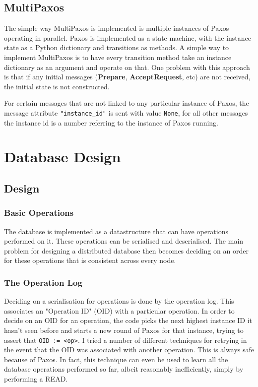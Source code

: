 \documentclass[12pt,twoside,notitlepage]{report}
\newcommand{\msg}[1] {{\bf #1}}
\begin{document}
\subsection{MultiPaxos}

The simple way MultiPaxos is implemented is multiple instances of Paxos operating in parallel.
Paxos is implemented as a state machine, with the instance state as a Python dictionary and
transitions as methods. A simple way to implement MultiPaxos is to have every transition method
take an instance dictionary as an argument and operate on that. One problem with this approach is
that if any initial messages (\msg{Prepare}, \msg{AcceptRequest}, etc) are not received, the
initial state is not constructed.

For certain messages that are not linked to any particular instance of Paxos, the message
attribute \verb+"instance_id"+ is sent with value \verb+None+, for all other messages the instance
id is a number referring to the instance of Paxos running.

\section{Database Design}

\subsection{Design}

\subsubsection{Basic Operations}

The database is implemented as a datastructure that can have operations performed on it. These
operations can be serialised and deserialised. The main problem for designing a distributed
database then becomes deciding on an order for these operations that is consistent across every
node.

\subsubsection{The Operation Log}

Deciding on a serialisation for operations is done by the operation log. This associates an
"Operation ID" (OID) with a particular operation. In order to decide on an OID for an operation,
the code picks the next highest instance ID it hasn't seen before and starts a new round of Paxos
for that instance, trying to assert that \verb$OID := <op>$. I tried a number of different
techniques for retrying in the event that the OID was associated with another operation. This is
always safe because of Paxos. In fact, this technique can even be used to learn all the database
operations performed so far, albeit reasonably inefficiently, simply by performing a READ.
\end{document}
